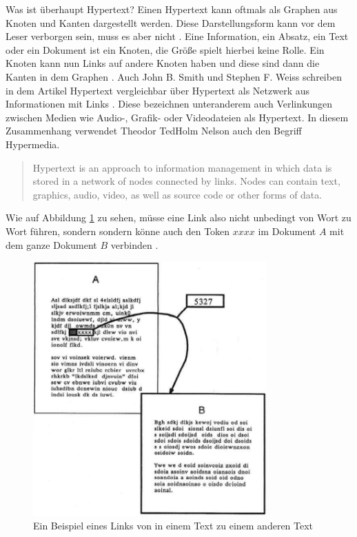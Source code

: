 \begin{section}{Was ist überhaupt Hypertext?}
Einen Hypertext kann oftmals als Graphen aus Knoten und Kanten dargestellt werden. Diese Darstellungsform kann vor dem Leser verborgen sein, muss es aber nicht \cite{Conklin1987}. Eine Information, ein Absatz, ein Text oder ein Dokument ist ein Knoten, die Größe spielt hierbei keine Rolle. Ein Knoten kann nun Links auf andere Knoten haben und diese sind dann die Kanten in dem Graphen \cite[S.19]{Conklin1987} \cite[S.2]{Nielsen1995}. Auch John B. Smith und Stephen F. Weiss schreiben in dem Artikel Hypertext vergleichbar über Hypertext als Netzwerk aus Informationen mit Links \cite{Smith1988}. Diese bezeichnen unteranderem auch Verlinkungen zwischen Medien wie Audio-, Grafik- oder Videodateien als Hypertext. In diesem Zusammenhang verwendet Theodor \glqq Ted\grqq{ }Holm Nelson auch den Begriff \glqq Hypermedia\grqq{ }\cite{Nelson1965}.

\begin{quote}
    \glqq [...] Hypertext is an approach to information management in which data is stored in a network of nodes connected by links. Nodes can contain text, graphics, audio, video, as well as source code or other forms of data.\grqq{ }\cite{Smith1988}
\end{quote}

Wie auf Abbildung \ref{fig:imText} zu sehen, müsse eine Link also nicht unbedingt von Wort zu Wort führen, sondern sondern könne auch den Token $xxxx$ im Dokument $A$ mit dem ganze Dokument $B$ verbinden \cite{Conklin1987}. 

\begin{figure}[H]
	\centering
	\includegraphics[width=0.8\textwidth]{image/imText}
	\caption{Ein Beispiel eines Links von in einem Text zu einem anderen Text \cite[S.34]{Conklin1987}}
	\label{fig:imText}
\end{figure}


\end{section}

